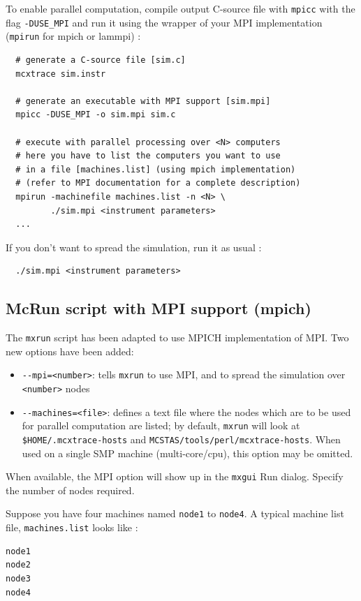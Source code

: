 To enable parallel computation, compile \MCX  output C-source file
with \verb'mpicc' with the flag \verb'-DUSE_MPI' and run it using the
wrapper of your MPI implementation (\verb'mpirun' for mpich or lammpi) :
\begin{verbatim}
  # generate a C-source file [sim.c]
  mcxtrace sim.instr

  # generate an executable with MPI support [sim.mpi]
  mpicc -DUSE_MPI -o sim.mpi sim.c

  # execute with parallel processing over <N> computers
  # here you have to list the computers you want to use
  # in a file [machines.list] (using mpich implementation)
  # (refer to MPI documentation for a complete description)
  mpirun -machinefile machines.list -n <N> \
         ./sim.mpi <instrument parameters>
  ...
\end{verbatim}

If you don't want to spread the simulation, run it as usual :
\begin{verbatim}
  ./sim.mpi <instrument parameters>
\end{verbatim}

\subsection{McRun script with MPI support (mpich)}

The \verb'mxrun' script has been adapted to use MPICH implementation
of MPI. Two new options have been added:
\begin{itemize}
\item \verb'--mpi=<number>': tells \verb'mxrun' to use MPI, and to
  spread the simulation over \verb'<number>' nodes
\item \verb'--machines=<file>': defines a text file where the
  nodes which are to be used for parallel computation are listed; by
  default, \verb'mxrun' will look at \verb'$HOME/.mcxtrace-hosts' and
  \verb'MCSTAS/tools/perl/mcxtrace-hosts'. When used on a single SMP machine (multi-core/cpu), this option may be omitted.
\end{itemize}
When available, the MPI option will show up in the \verb+mxgui+ Run dialog. Specify the number of nodes required.

Suppose you have four machines named \verb'node1' to \verb'node4'.
A typical machine list file, \verb'machines.list' looks like :
\begin{verbatim}
node1
node2
node3
node4
\end{verbatim}


